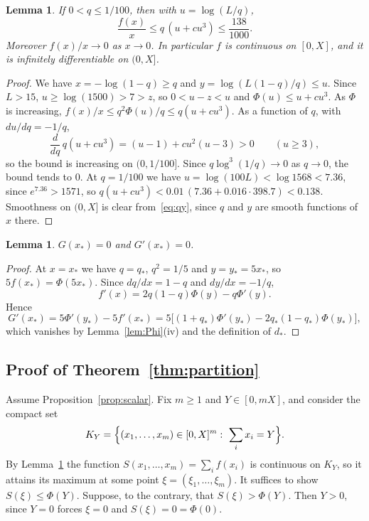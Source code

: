 \documentclass{amsart}
\numberwithin{equation}{section}
\numberwithin{table}{section}
\newtheorem{lemma}[theorem]{Lemma}
\theoremstyle{definition}
\theoremstyle{remark}
\newcommand{\qs}{q_{\ast}}
\newcommand{\xs}{x_{\ast}}
\newcommand{\ys}{y_{\ast}}
\newcommand{\ds}{d_{\ast}}
\begin{document}
\begin{lemma}\label{lem:small}
If $0<q\le1/100$, then with $u=\log(L/q)$,
\[
\frac{f(x)}{x}\le q\,(u+cu^3)\le\frac{138}{1000}.
\]
Moreover $f(x)/x\to0$ as $x\to0$. In particular $f$ is continuous on $[0,X]$, and it is infinitely differentiable on $(0,X]$.
\end{lemma}

\begin{proof}
We have $x=-\log(1-q)\ge q$ and $y=\log(L(1-q)/q)\le u$. Since $L>15$, $u\ge\log(1500)>7>z$, so $0<u-z<u$ and $\Phi(u)\le u+cu^3$. As $\Phi$ is increasing, $f(x)/x\le q^2\Phi(u)/q\le q(u+cu^3)$. As a function of $q$, with $du/dq=-1/q$,
\[
\frac{d}{dq}\,q(u+cu^3)=(u-1)+cu^2(u-3)>0\qquad(u\ge3),
\]
so the bound is increasing on $(0,1/100]$. Since $q\log^3(1/q)\to0$ as $q\to0$, the bound tends to $0$. At $q=1/100$ we have $u=\log(100L)<\log1568<7.36$, since $e^{7.36}>1571$, so $q(u+cu^3)<0.01\,(7.36+0.016\cdot 398.7)<0.138$. Smoothness on $(0,X]$ is clear from~\eqref{eq:qy}, since $q$ and $y$ are smooth functions of $x$ there.
\end{proof}

\begin{lemma}\label{lem:G}
$G(\xs)=0$ and $G'(\xs)=0$.
\end{lemma}

\begin{proof}
At $x=\xs$ we have $q=\qs$, $q^2=1/5$ and $y=\ys=5\xs$, so $5f(\xs)=\Phi(5\xs)$. Since $dq/dx=1-q$ and $dy/dx=-1/q$,
\begin{equation}\label{eq:fprime}
f'(x)=2q(1-q)\Phi(y)-q\Phi'(y).
\end{equation}
Hence
\[
G'(\xs)=5\Phi'(\ys)-5f'(\xs)=5\bigl[(1+\qs)\Phi'(\ys)-2\qs(1-\qs)\Phi(\ys)\bigr],
\]
which vanishes by Lemma~\ref{lem:Phi}(iv) and the definition of $\ds$.
\end{proof}

\subsection{Proof of Theorem~\ref{thm:partition}}
Assume Proposition~\ref{prop:scalar}. Fix $m\ge1$ and $Y\in[0,mX]$, and consider the compact set
\[
K_Y=\Bigl\{(x_1,\dots,x_m)\in[0,X]^m:\ \sum_ix_i=Y\Bigr\}.
\]
By Lemma~\ref{lem:small} the function $S(x_1,\dots,x_m)=\sum_if(x_i)$ is continuous on $K_Y$, so it attains its maximum at some point $\xi=(\xi_1,\dots,\xi_m)$. It suffices to show $S(\xi)\le\Phi(Y)$. Suppose, to the contrary, that $S(\xi)>\Phi(Y)$. Then $Y>0$, since $Y=0$ forces $\xi=0$ and $S(\xi)=0=\Phi(0)$.
\end{document}
